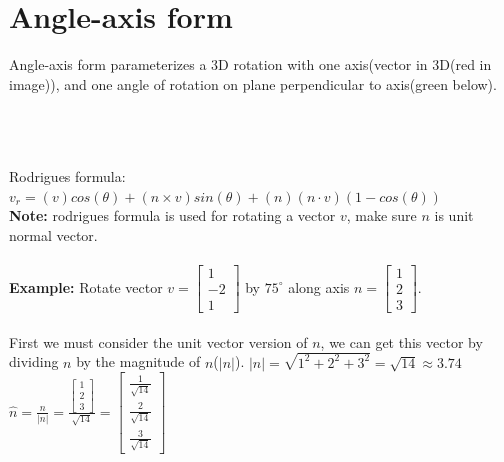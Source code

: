 \documentclass{article}
\begin{document}
\section{Angle-axis form}
Angle-axis form parameterizes a 3D rotation with one axis(vector in 3D(red in image)), and one angle of rotation on plane perpendicular to axis(green below).\\\\
\\\\
Rodrigues formula: $v_r=( v )cos(\theta) + (n \times v)sin(\theta) + (n)(n \cdot v)(1-cos(\theta))$\\
\textbf{Note: } rodrigues formula is used for rotating a vector $v$, make sure $n$ is unit normal vector.\\\\
\textbf{Example: } Rotate vector $v=\begin{bmatrix}
1\\
-2\\
1
\end{bmatrix}$ by $75^\circ$ along axis $n=\begin{bmatrix}
1\\
2\\
3
\end{bmatrix}
$. \\\\
First we must consider the unit vector version of $n$, we can get this vector by dividing $n$ by the magnitude of $n$($|n|$).\newpage
$|n|=\sqrt{1^2+2^2+3^2}=\sqrt{14} \approx 3.74$\\
$\hat{n}=\frac{n}{|n|}=\frac{\begin{bmatrix}
1\\
2\\
3
\end{bmatrix}}{\sqrt{14}}=\begin{bmatrix}
\frac{1}{\sqrt{14}}\\
\frac{2}{\sqrt{14}}\\
\frac{3}{\sqrt{14}}
\end{bmatrix}$\\
\end{document}
